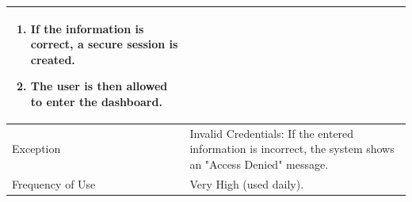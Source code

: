 \begin{table}[H]
\begin{tabularx}{\textwidth}{|l|X|}
\begin{enumerate}[nosep, leftmargin=*]
            \item If the information is correct, a secure session is created.
            \item The user is then allowed to enter the dashboard.
        \end{enumerate} \\ \hline
        Exception & {Invalid Credentials:} If the entered information is incorrect, the system shows an "Access Denied" message. \\ \hline
        Frequency of Use & Very High (used daily). \\ \hline
    \end{tabularx}
\end{table}
\FloatBarrier